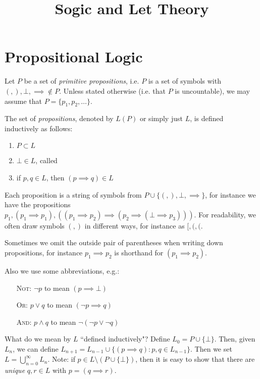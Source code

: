 \documentclass[10pt,a4paper]{article}
\title{Sogic and Let Theory}
\begin{document}
\maketitle

\section{Propositional Logic}
Let $P$ be a set of \emph{primitive propositions}, i.e. $P$ is a set of symbols with $(, ), \bot, \implies \notin P$. Unless stated otherwise (i.e. that $P$ is uncountable), we may assume that $P = \{p_1, p_2, \ldots \}$.

The set of \emph{propositions}, denoted by $L(P)$ or simply just $L$, is defined inductively as follows:
\begin{enumerate}
\item $P \subset L$
\item $\bot \in L$, called \false
\item if $p, q \in L$, then $(p \implies q) \in L$
\end{enumerate}

Each proposition is a string of symbols from $P \cup \{(,),\bot,\implies\}$, for instance we have the propositions $p_1, (p_1 \implies p_1), ((p_1\implies p_2)\implies(p_2 \implies(\bot \implies p_3)))$. For readability, we often draw symbols $(,)$ in different ways, for instance as $[, (, \Big($.

Sometimes we omit the outside pair of parentheses when writing down propositions, for instance $p_1 \implies p_2$ is shorthand for $(p_1 \implies p_2)$.

Also we use some abbreviations, e.g.:
\begin{itemize}
\item[\textsc{Not:}] $\neg p$ to mean $(p \implies \bot)$
\item[\textsc{Or:}] $p \lor q$ to mean $(\neg p \implies q)$
\item[\textsc{And:}] $p \land q$ to mean $\neg(\neg p \lor \neg q)$
\end{itemize}

What do we mean by $L$ ``defined inductively"? Define $L_0 = P \cup \{\bot\}$. Then, given $L_n$, we can define $L_{n+1} = L_{n-1} \cup \{(p\implies q) : p, q \in L_{n-1}\}$. Then we set $L = \bigcup_{n=0}^{\infty} L_n$. Note: if $p \in L \setminus(P \cup \{\bot\})$, then it is easy to show that there are \emph{unique} $q, r \in L$ with $p = (q \implies r)$.
\end{document}
